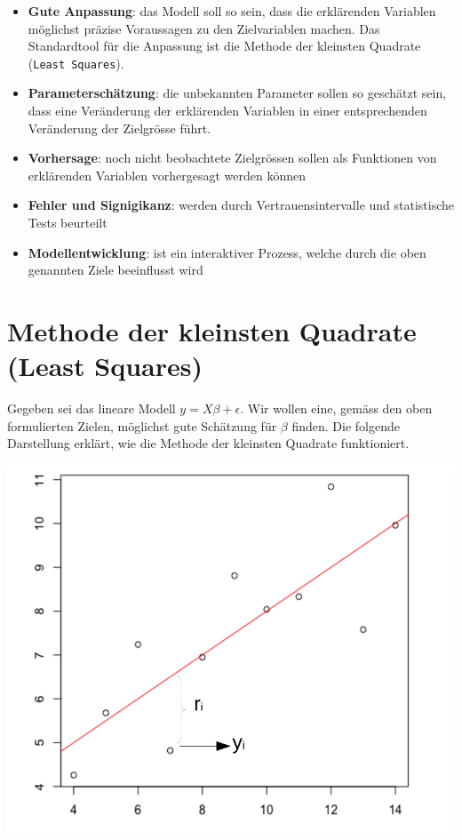 \documentclass[]{book}
\begin{document}
\begin{itemize}
\item
  \textbf{Gute Anpassung}: das Modell soll so sein, dass die erklärenden
  Variablen möglichst präzise Voraussagen zu den Zielvariablen machen.
  Das Standardtool für die Anpassung ist die Methode der kleinsten
  Quadrate (\texttt{Least\ Squares}).
\item
  \textbf{Parameterschätzung}: die unbekannten Parameter sollen so
  geschätzt sein, dass eine Veränderung der erklärenden Variablen in
  einer entsprechenden Veränderung der Zielgrösse führt.
\item
  \textbf{Vorhersage}: noch nicht beobachtete Zielgrössen sollen als
  Funktionen von erklärenden Variablen vorhergesagt werden können
\item
  \textbf{Fehler und Signigikanz}: werden durch Vertrauensintervalle und
  statistische Tests beurteilt
\item
  \textbf{Modellentwicklung}: ist ein interaktiver Prozess, welche durch
  die oben genannten Ziele beeinflusst wird
\end{itemize}

\section{Methode der kleinsten Quadrate (Least
Squares)}\label{methode-der-kleinsten-quadrate-least-squares}

Gegeben sei das lineare Modell \(y = X\beta + \epsilon\). Wir wollen
eine, gemäss den oben formulierten Zielen, möglichst gute Schätzung für
\(\beta\) finden. Die folgende Darstellung erklärt, wie die Methode der
kleinsten Quadrate funktioniert.

\begin{center}\includegraphics{LsqExplain} \end{center}
\end{document}
